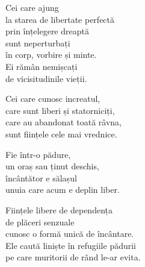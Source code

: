 Cei care ajung\\
la starea de libertate perfectă\\
prin înțelegere dreaptă\\
sunt neperturbați\\
în corp, vorbire și minte.\\
Ei rămân nemișcați\\
de vicisitudinile vieții.


Cei care cunosc increatul,\\
care sunt liberi și statorniciți,\\
care au abandonat toată râvna,\\
sunt ființele cele mai vrednice.


Fie într-o pădure,\\
un oraș sau ținut deschis,\\
încântător e sălașul\\
unuia care acum e deplin liber.


Ființele libere de dependența\\
de plăceri senzuale\\
cunosc o formă unică de încântare.\\
Ele caută liniște în refugiile pădurii\\
pe care muritorii de rând le-ar evita.
